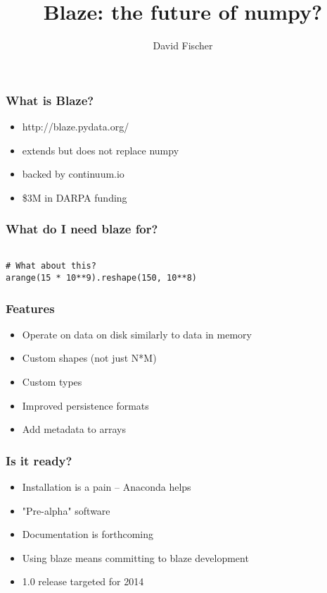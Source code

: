 \documentclass{beamer}
\title[San Diego Python]{Blaze: the future of numpy?}
\author{David Fischer}
\begin{document}
\begin{frame}
\titlepage
\end{frame}

\begin{frame}
\frametitle{What is Blaze?}
\begin{itemize}
\item http://blaze.pydata.org/
\item extends but does not replace numpy
\item backed by continuum.io
\item \$3M in DARPA funding
\end{itemize}
\end{frame}


\begin{frame}[fragile] %
\frametitle{What do I need blaze for?}
\begin{verbatim}

# What about this?
arange(15 * 10**9).reshape(150, 10**8)

\end{verbatim} 
\end{frame}


\begin{frame}
\frametitle{Features}
\begin{itemize}
\item Operate on data on disk similarly to data in memory
\item Custom shapes (not just N*M)
\item Custom types
\item Improved persistence formats   %
\item Add metadata to arrays
\end{itemize}
\end{frame}
 
 
\begin{frame}
\frametitle{Is it ready?}
\begin{itemize}
\item Installation is a pain -- Anaconda helps
\item "Pre-alpha" software
\item Documentation is forthcoming
\item Using blaze means committing to blaze development   %
\item 1.0 release targeted for 2014
\end{itemize}
\end{frame}
\end{document}
